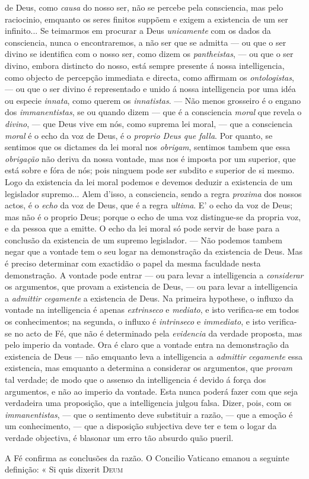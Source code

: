de Deus, como \emph{causa} do nosso ser, não se percebe pela consciencia, mas pelo raciocinio, emquanto os seres finitos suppõem e exigem a existencia de um ser infinito... Se teimarmos em procurar a Deus \emph{unicamente} com os dados da consciencia, nunca o encontraremos, a não ser que se admitta --- ou que o ser divino se identifica com o nosso ser, como dizem os \emph{pantheistas}, --- ou que o ser divino, embora distincto do nosso, está sempre presente á nossa intelligencia, como objecto de percepção immediata e directa, como affirmam os \emph{ontologistas}, --- ou que o ser divino é representado e unido á nossa intelligencia por uma idéa ou especie \emph{innata}, como querem os \emph{innatistas}. --- Não menos grosseiro é o engano dos \emph{immanentistas}, se ou quando dizem --- que é a consciencia \emph{moral} que revela o \emph{divino}, --- que Deus vive em nós, como suprema lei moral, --- que a consciencia \emph{moral} é o echo da voz de Deus, é o \emph{proprio Deus que falla}. Por quanto, se sentimos que os dictames da lei moral nos \emph{obrigam}, sentimos tambem que essa \emph{obrigação} não deriva da nossa vontade, mas nos é imposta por um superior, que está sobre e fóra de nós; pois ninguem pode ser subdito e superior de si mesmo. Logo da existencia da lei moral podemos e devemos deduzir a existencia de um legislador supremo... Alem d'isso, a consciencia, sendo a regra \emph{proxima} dos nossos actos, é o \emph{echo} da voz de Deus, que é a regra \emph{ultima}. E' o echo da voz de Deus; mas não é o proprio Deus; porque o echo de uma voz distingue-se da propria voz, e da pessoa que a emitte. O echo da lei moral só pode servir de base para a conclusão da existencia de um supremo legislador. --- Não podemos tambem negar que a vontade tem o seu logar na demonstração da existencia de Deus. Mas é preciso determinar com exactidão o papel da mesma faculdade nesta demonstração. A vontade pode entrar --- ou para levar a intelligencia a \emph{considerar} os argumentos, que provam a existencia de Deus, --- ou para levar a intelligencia a \emph{admittir cegamente} a existencia de Deus. Na primeira hypothese, o influxo da vontade na intelligencia é apenas \emph{extrinseco} e \emph{mediato}, e isto verifica-se em todos os conhecimentos; na segunda, o influxo é \emph{intrinseco} e \emph{immediato}, e isto verifica-se no acto de Fé, que não é determinado pela \emph{evidencia} da verdade proposta, mas pelo imperio da vontade. Ora é claro que a vontade entra na demonstração da existencia de Deus --- não emquanto leva a intelligencia a \emph{admittir cegamente} essa existencia, mas emquanto a determina a considerar os argumentos, que \emph{provam} tal verdade; de modo que o assenso da intelligencia é devido á força dos argumentos, e não ao imperio da vontade. Esta nunca poderá fazer com que seja verdadeira uma proposição, que a intelligencia julgou falsa. Dizer, pois, com os \emph{immanentistas}, --- que o sentimento deve substituir a razão, --- que a emoção é um conhecimento, --- que a disposição subjectiva deve ter e tem o logar da verdade objectiva, é blasonar um erro tão absurdo quão pueril.\par A Fé confirma as conclusões da razão. O Concilio Vaticano emanou a seguinte definição: « Si quis dixerit \textsc{Deum} 